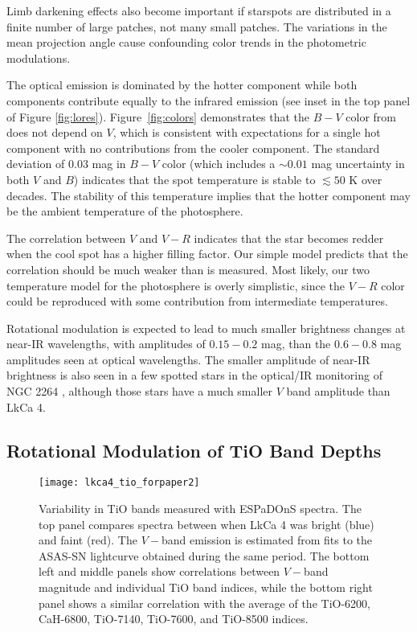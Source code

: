 \documentclass[twocolumn]{emulateapj}%
\begin{document}
Limb darkening effects also become important if starspots are distributed in a finite number of large patches, not many small patches.  The variations in the mean projection angle cause confounding color trends in the photometric modulations.

The optical emission is dominated by the hotter component while both components contribute equally to the infrared emission (see inset in the top panel of Figure \ref{fig:lores}).  Figure~\ref{fig:colors} demonstrates that the $B-V$ color from \citet{grankin08} does not depend on $V$, which is consistent with expectations for a single hot component with no contributions from the cooler component.  The standard deviation of 0.03 mag in $B-V$ color (which includes a $\sim 0.01$ mag uncertainty in both $V$ and $B$) indicates that the spot temperature is stable to $\lesssim 50$ K over decades.  The stability of this temperature implies that the hotter component may be the ambient temperature of the photosphere.

The correlation between $V$ and $V-R$ indicates that the star becomes redder when the cool spot has a higher filling factor.  Our simple model predicts that the correlation should be much weaker than is measured.  Most likely, our two temperature model for the photosphere is overly simplistic, since the $V-R$ color could be reproduced with some contribution from intermediate temperatures.

Rotational modulation is expected to lead to much smaller brightness changes at near-IR wavelengths, with amplitudes of $0.15-0.2$ mag, than the $0.6-0.8$ mag amplitudes seen at optical wavelengths.  The smaller amplitude of near-IR brightness is also seen in a few spotted stars in the optical/IR monitoring of NGC 2264 \citep{cody14}, although those stars have a much smaller $V$ band amplitude than LkCa 4.

\subsection{Rotational Modulation of TiO Band Depths}\label{sec:RotTiO}

\begin{figure*}
 \centering
 \texttt{[image: lkca4\_tio\_forpaper2]}
 \caption{Variability in TiO bands measured with ESPaDOnS spectra.  The top panel compares spectra between when LkCa 4 was bright (blue) and faint (red).  The $V-$band emission is estimated from fits to the ASAS-SN lightcurve obtained during the same period.  The bottom left and middle panels show correlations between $V-$band magnitude and individual TiO band indices, while the bottom right panel shows a similar correlation with the average of the TiO-6200, CaH-6800, TiO-7140, TiO-7600, and TiO-8500 indices.}
 \label{fig:tiovar}
\end{figure*}
\end{document}
